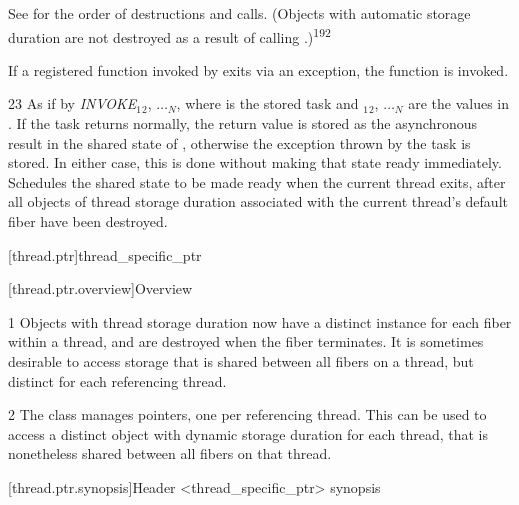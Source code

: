 \documentclass[fontsize=10pt,paper=A4,pagesize,DIV=15]{scrartcl}
\begin{document}
See  for the order of destructions and calls.
(Objects with automatic storage duration are not destroyed as a result of calling
.)\textsuperscript{192}

If a registered function invoked by  exits via an exception,
the function  is invoked.


23 \effects
As if by \emph{INVOKE}$_1$$_2$, $\dotsc$$_N$\cpp{)},
where  is the stored task and
$_1$$_2$, $\dotsc$$_N$ are the values in . If the task returns normally,
the return value is stored as the asynchronous result in the shared state of
\this, otherwise the exception thrown by the task is stored. In either
case, this is done without making that state ready immediately. Schedules
the shared state to be made ready when the current thread exits,
after all objects of thread storage duration associated with the current 
{thread's default fiber} have been destroyed.


\setcounter{section}{33}
\setcounter{subsection}{12}
\setcounter{secnumdepth}{4}

\cbstart

[thread.ptr]{thread\_specific\_ptr}

[thread.ptr.overview]{Overview}

1 Objects with thread storage duration now have a distinct instance for each
fiber within a thread, and are destroyed when the fiber terminates. It is
sometimes desirable to access storage that is shared between all fibers on a
thread, but distinct for each referencing thread.

2 The \tptr class manages pointers, one per referencing thread. This can be
used to access a distinct object with dynamic storage duration for each
thread, that is nonetheless shared between all fibers on that thread.

[thread.ptr.synopsis]{Header <thread\_specific\_ptr> synopsis}


\end{document}
